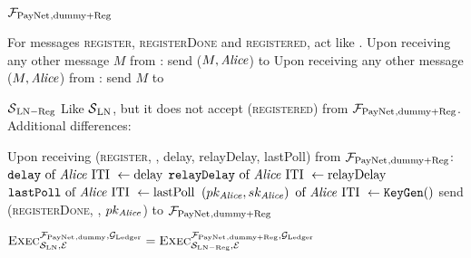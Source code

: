 \begin{systembox}{$\mathcal{F}_{\mathrm{PayNet}}{}_{\mathrm{, dummy + Reg}}$}
  \label{alg:fpaynet:reg}
  \begin{algorithmic}[1]
    \State For messages \textsc{register}, \textsc{registerDone} and
    \textsc{registered}, act like \fpaynet{}.
    \State Upon receiving any other message $M$ from \alice: send ($M, \mathit{Alice}$)
    to \simulator
    \State Upon receiving any other message ($M, \mathit{Alice}$) from \simulator: send
    $M$ to \alice
  \end{algorithmic}
\end{systembox}

\begin{simulatorbox}{$\mathcal{S}{}_{\mathrm{LN - Reg}}$}
  \label{alg:sim:reg}
  Like $\mathcal{S}{}_{\mathrm{LN}}$, but it does not accept
  (\textsc{registered}) from $\mathcal{F}_{\mathrm{PayNet}}{}_{\mathrm{, dummy + Reg}}$. Additional
  differences:
  \begin{algorithmic}[1]
    \State Upon receiving (\textsc{register}, \alice, delay, relayDelay,
    lastPoll) from $\mathcal{F}_{\mathrm{PayNet}}{}_{\mathrm{, dummy + Reg}}$:
    \Indent
      \State $\mathtt{delay} \text{ of \ensuremath{\mathit{Alice}}{} ITI } \gets \mathrm{delay}$
      \label{alg:sim:reg:delay}
      \State $\mathtt{relayDelay} \text{ of \ensuremath{\mathit{Alice}}{} ITI } \gets
      \mathrm{relayDelay}$
      \State $\mathtt{lastPoll} \text{ of \ensuremath{\mathit{Alice}}{} ITI } \gets
      \mathrm{lastPoll}$
      \State $\left(pk_{\mathit{Alice}}, sk_{\mathit{Alice}}\right) \text{ of \ensuremath{\mathit{Alice}}{} ITI }
      \gets \mathtt{KeyGen}()$
      \label{alg:sim:reg:keygen}
      \State send (\textsc{registerDone}, \alice, $pk_{\mathit{Alice}}$) to
      $\mathcal{F}_{\mathrm{PayNet}}{}_{\mathrm{, dummy + Reg}}$
    \EndIndent
  \end{algorithmic}
\end{simulatorbox}

\begin{lemma}
  \label{lemma:reg}
  $\textsc{Exec}^{\mathcal{F}_{\mathrm{PayNet}}{}_{\mathrm{, dummy}},
  \mathcal{G}_{\mathrm{Ledger}}}_{\mathcal{S}_{\mathrm{LN}}, \mathcal{E}} =
  \textsc{Exec}^{\mathcal{F}_{\mathrm{PayNet}}{}_{\mathrm{, dummy + Reg}},
  \mathcal{G}_{\mathrm{Ledger}}}_{\mathcal{S}_{\mathrm{LN - Reg}}, \mathcal{E}}$
\end{lemma}

